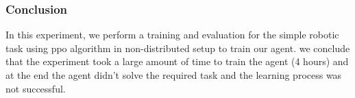 \subsubsection{Conclusion}

In this experiment, we perform a training and evaluation for the simple robotic task using ppo algorithm in non-distributed setup to train our agent. we conclude that the experiment took a large amount of time to train the agent (4 hours) and at the end the agent didn't solve the required task and the learning process was not successful. 